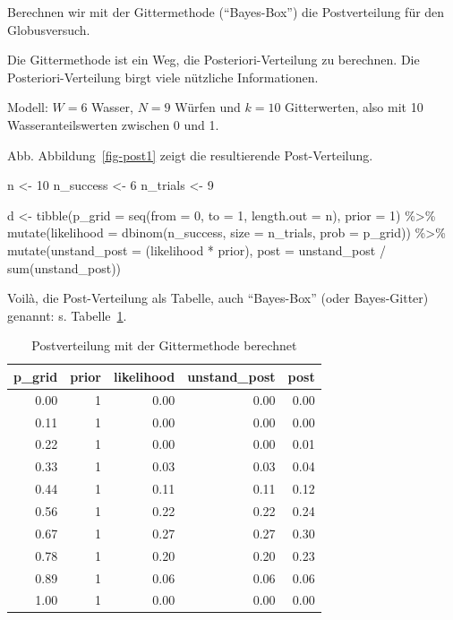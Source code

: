 \documentclass[
  a4paper,
  DIV=11]{scrreprt}
\newenvironment{Shaded}{\begin{snugshade}}{\end{snugshade}}
\newcommand{\AttributeTok}[1]{\textcolor[rgb]{0.40,0.45,0.13}{#1}}
\newcommand{\DecValTok}[1]{\textcolor[rgb]{0.68,0.00,0.00}{#1}}
\newcommand{\FunctionTok}[1]{\textcolor[rgb]{0.28,0.35,0.67}{#1}}
\newcommand{\NormalTok}[1]{\textcolor[rgb]{0.00,0.23,0.31}{#1}}
\newcommand{\OtherTok}[1]{\textcolor[rgb]{0.00,0.23,0.31}{#1}}
\newcommand{\SpecialCharTok}[1]{\textcolor[rgb]{0.37,0.37,0.37}{#1}}
\theoremstyle{definition}
\theoremstyle{remark}
\begin{document}
Berechnen wir mit der Gittermethode (``Bayes-Box'') die Postverteilung
für den Globusversuch.

Die Gittermethode ist ein Weg, die Posteriori-Verteilung zu berechnen.
Die Posteriori-Verteilung birgt viele nützliche Informationen.

Modell: \(W=6\) Wasser, \(N=9\) Würfen und \(k=10\) Gitterwerten, also
mit 10 Wasseranteilswerten zwischen 0 und 1.

Abb. Abbildung~\ref{fig-post1} zeigt die resultierende Post-Verteilung.

\begin{Shaded}
\begin{Highlighting}[]
\NormalTok{n }\OtherTok{\textless{}{-}} \DecValTok{10}
\NormalTok{n\_success }\OtherTok{\textless{}{-}} \DecValTok{6}
\NormalTok{n\_trials  }\OtherTok{\textless{}{-}} \DecValTok{9}

\NormalTok{d }\OtherTok{\textless{}{-}}
  \FunctionTok{tibble}\NormalTok{(}\AttributeTok{p\_grid =} \FunctionTok{seq}\NormalTok{(}\AttributeTok{from =} \DecValTok{0}\NormalTok{, }\AttributeTok{to =} \DecValTok{1}\NormalTok{, }\AttributeTok{length.out =}\NormalTok{ n),}
         \AttributeTok{prior  =} \DecValTok{1}\NormalTok{) }\SpecialCharTok{\%\textgreater{}\%} 
  \FunctionTok{mutate}\NormalTok{(}\AttributeTok{likelihood =} \FunctionTok{dbinom}\NormalTok{(n\_success, }
                             \AttributeTok{size =}\NormalTok{ n\_trials, }
                             \AttributeTok{prob =}\NormalTok{ p\_grid)) }\SpecialCharTok{\%\textgreater{}\%} 
  \FunctionTok{mutate}\NormalTok{(}\AttributeTok{unstand\_post =}\NormalTok{ (likelihood }\SpecialCharTok{*}\NormalTok{ prior),}
         \AttributeTok{post =}\NormalTok{ unstand\_post }\SpecialCharTok{/} \FunctionTok{sum}\NormalTok{(unstand\_post))}
\end{Highlighting}
\end{Shaded}

Voilà, die Post-Verteilung als Tabelle, auch ``Bayes-Box'' (oder
Bayes-Gitter) genannt: s. Tabelle~\ref{tbl-post1}.

\hypertarget{tbl-post1}{}
\begin{longtable}{rrrrr}
\caption{\label{tbl-post1}Postverteilung mit der Gittermethode berechnet }\tabularnewline

\toprule
p\_grid & prior & likelihood & unstand\_post & post \\ 
\midrule
0.00 & 1 & 0.00 & 0.00 & 0.00 \\ 
0.11 & 1 & 0.00 & 0.00 & 0.00 \\ 
0.22 & 1 & 0.00 & 0.00 & 0.01 \\ 
0.33 & 1 & 0.03 & 0.03 & 0.04 \\ 
0.44 & 1 & 0.11 & 0.11 & 0.12 \\ 
0.56 & 1 & 0.22 & 0.22 & 0.24 \\ 
0.67 & 1 & 0.27 & 0.27 & 0.30 \\ 
0.78 & 1 & 0.20 & 0.20 & 0.23 \\ 
0.89 & 1 & 0.06 & 0.06 & 0.06 \\ 
1.00 & 1 & 0.00 & 0.00 & 0.00 \\ 
\bottomrule
\end{longtable}
\end{document}
